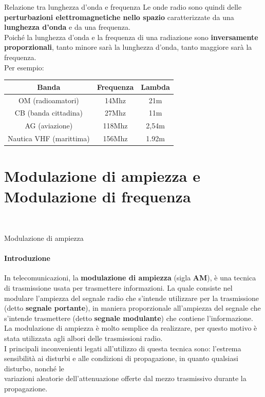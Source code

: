 \documentclass[aspectratio=169]{beamer}
\begin{document}
\begin{frame}{Relazione tra lunghezza d'onda e frequenza}
	Le onde radio sono quindi delle \textbf{perturbazioni elettromagnetiche nello spazio} caratterizzate da una \textbf{lunghezza d'onda} e da una frequenza.\\
	Poiché la lunghezza d'onda e la frequenza di una radiazione sono \textbf{inversamente proporzionali}, tanto minore sarà la lunghezza d'onda, tanto maggiore sarà la frequenza.\\
	\medskip
	Per esempio:\\
	\centering
	\begin{tabular}{|c|c|c|}
		\hline
		\textbf{Banda}& \textbf{Frequenza} & \textbf{Lambda} \\
		\hline
		OM (radioamatori)& 14Mhz & 21m \\
		\hline
		CB (banda cittadina)& 27Mhz & 11m\\
		\hline
		AG (aviazione)& 118Mhz & 2,54m \\
		\hline
		Nautica VHF (marittima)& 156Mhz & 1.92m \\
		\hline
	\end{tabular}
\end{frame}

\section{Modulazione di ampiezza e Modulazione di frequenza}
\begin{frame}
	\\
\end{frame}

\begin{frame}{Modulazione di ampiezza}
	\framesubtitle{Introduzione}
	In telecomunicazioni, la \textbf{modulazione di ampiezza} (sigla \textbf{AM}), è una tecnica di trasmissione usata per trasmettere informazioni. La quale consiste nel modulare l'ampiezza del segnale radio che s'intende utilizzare per la trasmissione (detto \textbf{segnale portante}), in maniera proporzionale all'ampiezza del segnale che s'intende trasmettere (detto \textbf{segnale modulante}) che contiene l'informazione.\\
	\medskip
	La modulazione di ampiezza è molto semplice da realizzare, per questo motivo è stata utilizzata agli albori delle trasmissioni radio.\\
	\medskip
	I principali inconvenienti legati all'utilizzo di questa tecnica sono: l'estrema sensibilità ai disturbi e alle condizioni di propagazione, in quanto qualsiasi disturbo, nonché le \\ variazioni aleatorie dell'attenuazione offerte dal mezzo trasmissivo durante la \\propagazione.
\end{frame}
\end{document}
